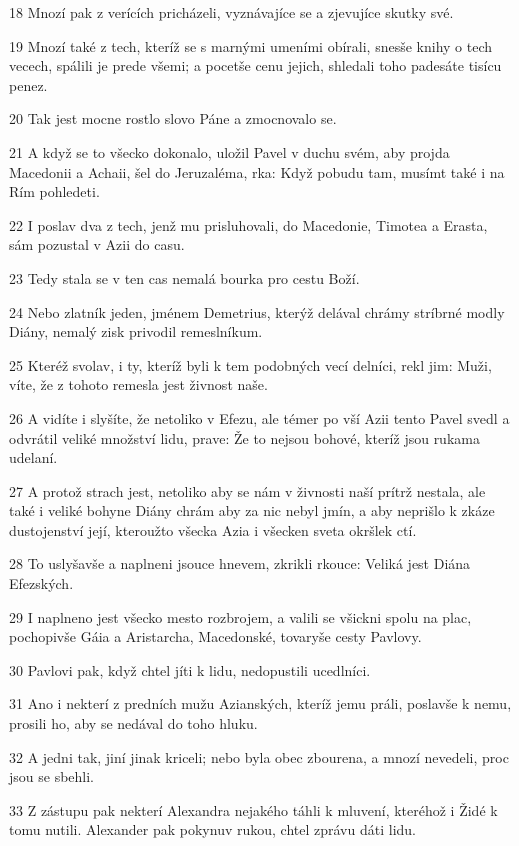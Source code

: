\par 18 Mnozí pak z verících pricházeli, vyznávajíce se a zjevujíce skutky své.
\par 19 Mnozí také z tech, kteríž se s marnými umeními obírali, snesše knihy o tech vecech, spálili je prede všemi; a pocetše cenu jejich, shledali toho padesáte tisícu penez.
\par 20 Tak jest mocne rostlo slovo Páne a zmocnovalo se.
\par 21 A když se to všecko dokonalo, uložil Pavel v duchu svém, aby projda Macedonii a Achaii, šel do Jeruzaléma, rka: Když pobudu tam, musímt také i na Rím pohledeti.
\par 22 I poslav dva z tech, jenž mu prisluhovali, do Macedonie, Timotea a Erasta, sám pozustal v Azii do casu.
\par 23 Tedy stala se v ten cas nemalá bourka pro cestu Boží.
\par 24 Nebo zlatník jeden, jménem Demetrius, kterýž delával chrámy stríbrné modly Diány, nemalý zisk privodil remeslníkum.
\par 25 Kteréž svolav, i ty, kteríž byli k tem podobných vecí delníci, rekl jim: Muži, víte, že z tohoto remesla jest živnost naše.
\par 26 A vidíte i slyšíte, že netoliko v Efezu, ale témer po vší Azii tento Pavel svedl a odvrátil veliké množství lidu, prave: Že to nejsou bohové, kteríž jsou rukama udelaní.
\par 27 A protož strach jest, netoliko aby se nám v živnosti naší prítrž nestala, ale také i veliké bohyne Diány chrám aby za nic nebyl jmín, a aby neprišlo k zkáze dustojenství její, kteroužto všecka Azia i všecken sveta okršlek ctí.
\par 28 To uslyšavše a naplneni jsouce hnevem, zkrikli rkouce: Veliká jest Diána Efezských.
\par 29 I naplneno jest všecko mesto rozbrojem, a valili se všickni spolu na plac, pochopivše Gáia a Aristarcha, Macedonské, tovaryše cesty Pavlovy.
\par 30 Pavlovi pak, když chtel jíti k lidu, nedopustili ucedlníci.
\par 31 Ano i nekterí z predních mužu Azianských, kteríž jemu práli, poslavše k nemu, prosili ho, aby se nedával do toho hluku.
\par 32 A jedni tak, jiní jinak kriceli; nebo byla obec zbourena, a mnozí nevedeli, proc jsou se sbehli.
\par 33 Z zástupu pak nekterí Alexandra nejakého táhli k mluvení, kteréhož i Židé k tomu nutili. Alexander pak pokynuv rukou, chtel zprávu dáti lidu.
